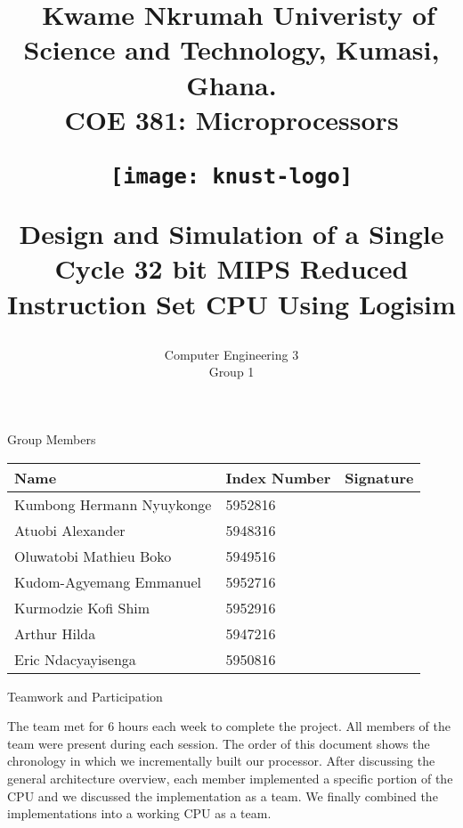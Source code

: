 \documentclass[12pt]{report}
\begin{document}
  \title{
   \ Kwame Nkrumah Univeristy of Science and Technology, Kumasi, Ghana.\\
   { \huge COE 381: Microprocessors}\\
   \begin{center}
    \texttt{[image: knust-logo]}
    \end{center}
    Design and Simulation of a Single Cycle 32 bit MIPS Reduced Instruction Set CPU Using Logisim}
    \author{ Computer Engineering 3\\ Group 1}
    \maketitle
    \begin{center}
    \begin{table}{}
    {\centering \Huge Group Members}\\
     \renewcommand{\arraystretch}{2}
   \begin{tabular}{|p{7cm}|p{3cm}|p{4cm}|}
     \hline
    {\Large \textbf{Name}}&{\Large \textbf{Index Number}}&\textbf{\Large Signature}\\\hline
    {\large Kumbong Hermann Nyuykonge}& {\large 5952816}&\\\hline
    {\large Atuobi Alexander }&{\large 5948316}&\\\hline
    {\large Oluwatobi Mathieu Boko}&{\large 5949516}&\\\hline
    {\large Kudom-Agyemang Emmanuel}&{\large 5952716}&\\\hline
    {\large Kurmodzie Kofi Shim}&{\large 5952916}&\\\hline
    {\large Arthur Hilda}&{\large 5947216}&\\\hline
    {\Large Eric Ndacyayisenga}&{\large 5950816}&\\\hline
   \end{tabular}
    \end{table}
    \end{center}
   \begin{center}
   {\Huge Teamwork and Participation}
\end{center} 
    The team met for 6 hours each week to complete the project. All members of the team were present during each session. The order of this document shows the chronology in which we  incrementally built our processor. After discussing the general architecture overview, each member implemented a specific portion of the CPU and we discussed the implementation as a team. We finally combined the implementations into a working CPU as a team.  
\end{document}
